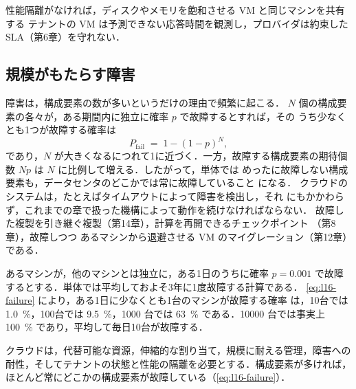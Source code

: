 \documentclass[../main.tex]{subfiles}
\begin{document}
性能隔離がなければ，ディスクやメモリを飽和させる VM と同じマシンを共有する
テナントの VM は予測できない応答時間を観測し，プロバイダは約束した
SLA（第6章）を守れない．

\subsection{規模がもたらす障害}

障害は，構成要素の数が多いというだけの理由で頻繁に起こる．%
$N$ 個の構成要素の各々が，ある期間内に独立に確率 $p$ で故障するとすれば，その
うち少なくとも1つが故障する確率は
\begin{equation}
  P_{\mathrm{fail}} \;=\; 1 - (1-p)^{N} ,
  \label{eq:l16-failure}
\end{equation}
であり，$N$ が大きくなるにつれて1に近づく．一方，故障する構成要素の期待個数
$Np$ は $N$ に比例して増える．したがって，単体では
めったに故障しない構成要素も，データセンタのどこかでは常に故障していること
になる．%
クラウドのシステムは，たとえばタイムアウトによって障害を検出し，それ
にもかかわらず，これまでの章で扱った機構によって動作を続けなければならない．
故障した複製を引き継ぐ複製（第14章），計算を再開できるチェックポイント
（第8章），故障しつつ
あるマシンから退避させる VM のマイグレーション（第12章）である．

\begin{example}
  あるマシンが，他のマシンとは独立に，ある1日のうちに確率 $p = 0.001$ で故障
  するとする．単体では平均しておよそ3年に1度故障する計算である．
  \cref{eq:l16-failure} により，ある1日に少なくとも1台のマシンが故障する確率
  は，10台では \SI{1.0}{\percent}，100台では \SI{9.5}{\percent}，\num{1000}
  台では \SI{63}{\percent} である．\num{10000} 台では事実上
  \SI{100}{\percent} であり，平均して毎日10台が故障する．
\end{example}

\begin{keypoint}
  クラウドは，代替可能な資源，伸縮的な割り当て，規模に耐える管理，障害への
  耐性，そしてテナントの状態と性能の隔離を必要とする．構成要素が多ければ，
  ほとんど常にどこかの構成要素が故障している（\cref{eq:l16-failure}）．
\end{keypoint}
\end{document}
